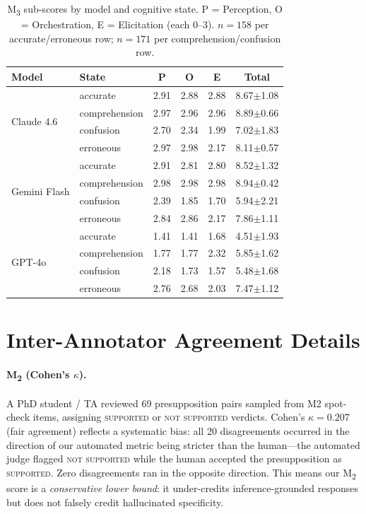 \documentclass[11pt]{article}
\newcommand{\mtwo}{M\textsubscript{2}\xspace}
\begin{document}
\begin{table}[h]
\centering
\small
\begin{tabular}{llcccc}
\toprule
\textbf{Model} & \textbf{State} & \textbf{P} & \textbf{O} & \textbf{E} & \textbf{Total} \\
\midrule
\multirow{4}{*}{Claude 4.6}
  & accurate      & 2.91 & 2.88 & 2.88 & 8.67\scriptsize{$\pm$1.08} \\
  & comprehension & 2.97 & 2.96 & 2.96 & 8.89\scriptsize{$\pm$0.66} \\
  & confusion     & 2.70 & 2.34 & 1.99 & 7.02\scriptsize{$\pm$1.83} \\
  & erroneous     & 2.97 & 2.98 & 2.17 & 8.11\scriptsize{$\pm$0.57} \\
\midrule
\multirow{4}{*}{Gemini Flash}
  & accurate      & 2.91 & 2.81 & 2.80 & 8.52\scriptsize{$\pm$1.32} \\
  & comprehension & 2.98 & 2.98 & 2.98 & 8.94\scriptsize{$\pm$0.42} \\
  & confusion     & 2.39 & 1.85 & 1.70 & 5.94\scriptsize{$\pm$2.21} \\
  & erroneous     & 2.84 & 2.86 & 2.17 & 7.86\scriptsize{$\pm$1.11} \\
\midrule
\multirow{4}{*}{GPT-4o}
  & accurate      & 1.41 & 1.41 & 1.68 & 4.51\scriptsize{$\pm$1.93} \\
  & comprehension & 1.77 & 1.77 & 2.32 & 5.85\scriptsize{$\pm$1.62} \\
  & confusion     & 2.18 & 1.73 & 1.57 & 5.48\scriptsize{$\pm$1.68} \\
  & erroneous     & 2.76 & 2.68 & 2.03 & 7.47\scriptsize{$\pm$1.12} \\
\bottomrule
\end{tabular}
\caption{M\textsubscript{3} sub-scores by model and cognitive state.
P = Perception, O = Orchestration, E = Elicitation (each 0--3).
$n = 158$ per accurate/erroneous row; $n = 171$ per comprehension/confusion
row.}
\label{tab:bystate}
\end{table}

\section{Inter-Annotator Agreement Details}
\label{app:iaa}

\paragraph{M\textsubscript{2} (Cohen's $\kappa$).}
A PhD student / TA reviewed 69 presupposition pairs sampled from M2
spot-check items, assigning \textsc{supported} or \textsc{not supported}
verdicts.
Cohen's $\kappa = 0.207$ (fair agreement) reflects a systematic bias: all
20 disagreements occurred in the direction of our automated metric being
stricter than the human---the automated judge flagged \textsc{not supported}
while the human accepted the presupposition as \textsc{supported}.
Zero disagreements ran in the opposite direction.
This means our \mtwo score is a \emph{conservative lower bound}: it
under-credits inference-grounded responses but does not falsely credit
hallucinated specificity.
\end{document}
